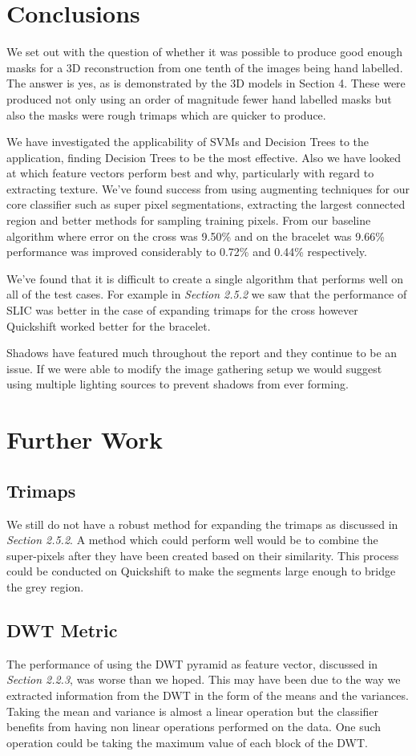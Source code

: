 \documentclass[12pt]{IIBproject}
\begin{document}
\section{Conclusions}
We set out with the question of whether it was possible to produce good enough masks for a 3D reconstruction from one tenth of the images being hand labelled. The answer is yes, as is demonstrated by the 3D models in Section 4. These were produced not only using an order of magnitude fewer hand labelled masks but also the masks were rough trimaps which are quicker to produce.

We have investigated the applicability of SVMs and Decision Trees to the application, finding Decision Trees to be the most effective. Also we have looked at which feature vectors perform best and why, particularly with regard to extracting texture. We've found success from using augmenting techniques for our core classifier such as super pixel segmentations, extracting the largest connected region and better methods for sampling training pixels. From our baseline algorithm where error on the cross was 9.50\% and on the bracelet was 9.66\% performance was improved considerably to 0.72\% and 0.44\% respectively. 

We've found that it is difficult to create a single algorithm that performs well on all of the test cases. For example in \emph{Section 2.5.2} we saw that the performance of SLIC was better in the case of expanding trimaps for the cross however Quickshift worked better for the bracelet. 

Shadows have featured much throughout the report and they continue to be an issue. If we were able to modify the image gathering setup we would suggest using multiple lighting sources to prevent shadows from ever forming.


\section{Further Work}
\subsection{Trimaps}
We still do not have a robust method for expanding the trimaps as discussed in \emph{Section 2.5.2}. A method which could perform well would be to combine the super-pixels after they have been created based on their similarity\cite{shih2005automatic}. This process could be conducted on Quickshift to make the segments large enough to bridge the grey region.
\subsection{DWT Metric}
The performance of using the DWT pyramid as feature vector, discussed in \emph{Section 2.2.3}, was worse than we hoped. This may have been due to the way we extracted information from the DWT in the form of the means and the variances. Taking the mean and variance is almost a linear operation but the classifier benefits from having non linear operations performed on the data. One such operation could be taking the maximum value of each block of the DWT. 
\end{document}
